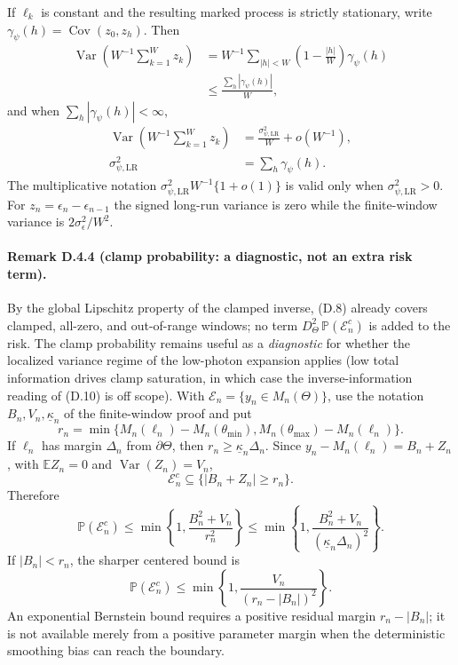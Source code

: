 If $\ell_k$ is constant and the resulting marked process is strictly
stationary, write $\gamma_\psi(h)=\operatorname{Cov}(z_0,z_h)$. Then
\[
\begin{aligned}
\operatorname{Var}\!\left(W^{-1}\sum_{k=1}^Wz_k\right)
&=
W^{-1}\sum_{|h|<W}\left(1-\frac{|h|}{W}\right)\gamma_\psi(h)\\
&\le\frac{\sum_h|\gamma_\psi(h)|}{W},
\end{aligned}
\]
and when $\sum_h|\gamma_\psi(h)|<\infty$,
\[
\begin{aligned}
\operatorname{Var}\!\left(W^{-1}\sum_{k=1}^Wz_k\right)
&=\frac{\sigma_{\psi,\mathrm{LR}}^2}{W}+o(W^{-1}),\\
\sigma_{\psi,\mathrm{LR}}^2
&=\sum_h\gamma_\psi(h).
\end{aligned}
\]
The multiplicative notation
$\sigma_{\psi,\mathrm{LR}}^2W^{-1}\{1+o(1)\}$ is valid only when
$\sigma_{\psi,\mathrm{LR}}^2>0$. For
$z_n=\epsilon_n-\epsilon_{n-1}$ the signed long-run variance is zero
while the finite-window variance is $2\sigma_\epsilon^2/W^2$.

\paragraph{Remark D.4.4 (clamp probability: a diagnostic, not an
extra risk term).}
By the global Lipschitz property of the clamped inverse, (D.8)
already covers clamped, all-zero, and out-of-range windows; no term
$D_\Theta^2\,\mathbb P(\mathcal E_n^c)$ is added to the risk. The
clamp probability remains useful as a \emph{diagnostic} for whether
the localized variance regime of the low-photon expansion applies
(low total information drives clamp saturation, in which case the
inverse-information reading of (D.10) is off scope). With
$\mathcal E_n=\{y_n\in M_n(\Theta)\}$, use the notation
$B_n,V_n,\underline\kappa_n$ of the finite-window proof and put
\[
r_n=
\min\{M_n(\ell_n)-M_n(\theta_{\min}),
M_n(\theta_{\max})-M_n(\ell_n)\}.
\]
If $\ell_n$ has margin $\Delta_n$ from $\partial\Theta$, then
$r_n\ge\underline\kappa_n\Delta_n$. Since
$y_n-M_n(\ell_n)=B_n+Z_n$, with
$\mathbb EZ_n=0$ and $\operatorname{Var}(Z_n)=V_n$,
\[
\mathcal E_n^c\subseteq\{|B_n+Z_n|\ge r_n\}.
\]
Therefore
\[
\mathbb P(\mathcal E_n^c)
\le\min\left\{1,\frac{B_n^2+V_n}{r_n^2}\right\}
\le\min\left\{1,\frac{B_n^2+V_n}{(\underline\kappa_n\Delta_n)^2}\right\}.
\]
If $|B_n|<r_n$, the sharper centered bound is
\[
\mathbb P(\mathcal E_n^c)
\le\min\left\{1,\frac{V_n}{(r_n-|B_n|)^2}\right\}.
\]
An exponential Bernstein bound requires a positive residual margin
$r_n-|B_n|$; it is not available merely from a positive parameter
margin when the deterministic smoothing bias can reach the boundary.

